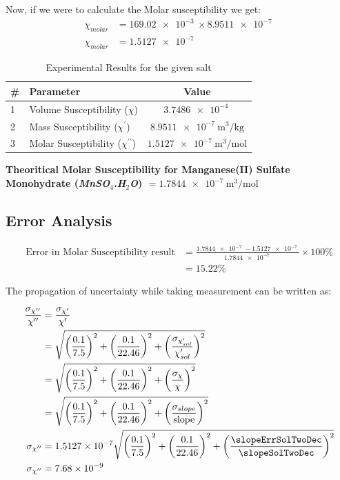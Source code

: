 \documentclass[../main.tex]{subfiles}
\begin{document}
Now, if we were to calculate the Molar susceptibility we get:
\begin{align*}
	\chi_{molar} &= \SI{169.02e-3}{} \times \SI{8.9511e-7}{} \\
	\chi_{molar} &= \SI{1.5127e-7}{}
\end{align*}

\begin{table}[H]
	\centering
	\caption{Experimental Results for the given salt}
	\begin{tabular}{llc}
		\toprule
		\# & Parameter & Value \\
		\midrule
		1 & Volume Susceptibility ($\chi$) & $\SI{3.7486e-4}{}$ \\
		2 & Mass Susceptibility ($\chi^{\prime}$) & $\SI{8.9511e-7}{\meter\cubed\per\kilo\gram}$ \\ 
		3 & Molar Susceptibility ($\chi^{\prime\prime}$) & $\SI{1.5127e-7}{\meter\cubed\per\mole}$ \\
		\bottomrule
	\end{tabular}
\end{table}
\textbf{Theoritical Molar Susceptibility for Manganese(II) Sulfate Monohydrate (\textit{MnSO$_4$.H$_2$O}) $= \SI{1.7844e-7}{\meter\cubed\per\mole}$}

\subsection*{Error Analysis}
\begin{align*}
	\textrm{Error in Molar Susceptibility result} &= \frac{\SI{1.7844e-7}{}-\SI{1.5127e-7}{}}{\SI{1.7844e-7}{}}\times 100\% \\
						      &= 15.22\%
\end{align*}

The propagation of uncertainty while taking measurement can be written as:

\begin{align*}
	\frac{ \sigma_{\chi^{\prime\prime}} }{ \chi^{\prime\prime} } &=  \frac{ \sigma_{\chi^{\prime}} }{ \chi^{\prime} } \\
								     &= \sqrt{ \left(\frac{0.1}{7.5}\right)^2 + \left(\frac{0.1}{22.46}\right)^2 + \left(\frac{ \sigma_{\chi^{\prime}_{sol}}}{ \chi^{\prime}_{sol} }\right)^2 } \\
								     &= \sqrt{ \left(\frac{0.1}{7.5}\right)^2 + \left(\frac{0.1}{22.46}\right)^2 + \left(\frac{\sigma_{\chi}}{\chi} \right)^2 } \\
								     &= \sqrt{ \left(\frac{0.1}{7.5}\right)^2 + \left(\frac{0.1}{22.46}\right)^2 + \left(\frac{\sigma_{slope}}{\textrm{slope}} \right)^2 } \\
	\sigma_{\chi^{\prime\prime}} &= \SI{1.5127e-7}{} \sqrt{ \left(\frac{0.1}{7.5}\right)^2 + \left(\frac{0.1}{22.46}\right)^2 + \left(\frac{\slopeErrSolTwoDec}{\slopeSolTwoDec} \right)^2 } \\
	\sigma_{\chi^{\prime\prime}} &= \SI{7.68e-9}{} 
\end{align*}
\end{document}
